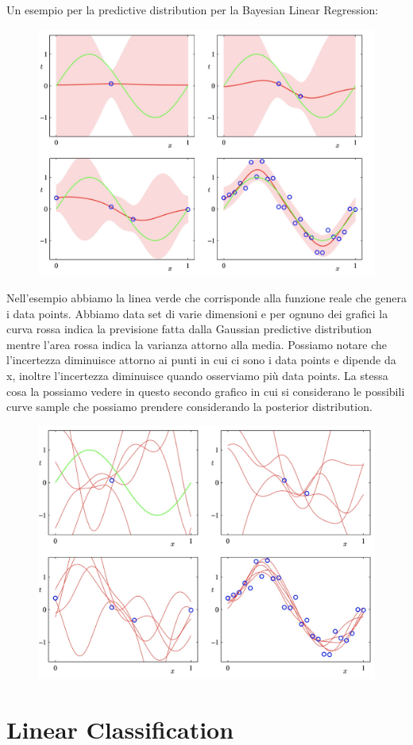 \documentclass[14pt]{extreport}
\begin{document}
Un esempio per la predictive distribution per la Bayesian Linear Regression:

\begin{figure}[H]
\centering
\includegraphics[width=0.7\linewidth]{139.jpeg}
\end{figure}

Nell'esempio abbiamo la linea verde che corrisponde alla funzione reale che genera i data points. Abbiamo data set di varie dimensioni e per ognuno
dei grafici la curva rossa indica la previsione fatta dalla Gaussian predictive distribution mentre l'area rossa indica la varianza attorno alla
media. Possiamo notare che l'incertezza diminuisce attorno ai punti in cui ci sono i data points e dipende da x, inoltre l'incertezza diminuisce
quando osserviamo più data points. La stessa cosa la possiamo vedere in questo secondo grafico in cui si considerano le possibili curve sample che
possiamo prendere considerando la posterior distribution.
\begin{figure}[H]
\centering
\includegraphics[width=0.7\linewidth]{140.jpeg}
\end{figure}


\chapter{Linear Classification}
\end{document}
